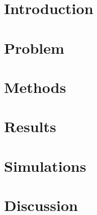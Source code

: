 \documentclass[]{article}
\begin{document}
	\begin{abstract}
		
	\end{abstract}
	
	\section{Introduction} 
		
	\section{Problem}
		
	\section{Methods}
		
	\section{Results}
		
	\section{Simulations}
		
	\section{Discussion}
		
\end{document}
